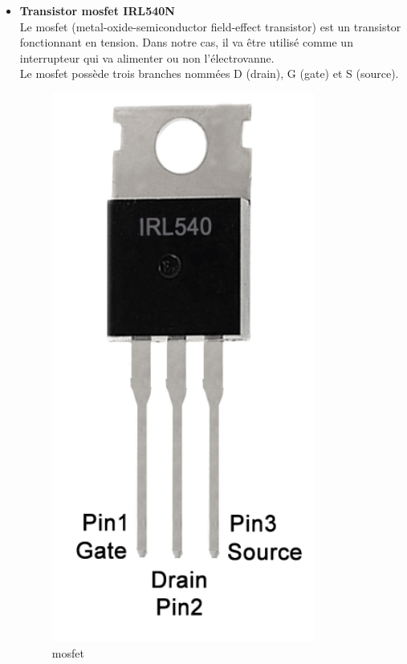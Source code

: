 \begin{itemize}
    \item \textbf{Transistor \gls{mosfet} IRL540N}\\
          Le \gls{mosfet} (metal-oxide-semiconductor field-effect transistor) est un transistor fonctionnant en tension. Dans notre cas, il va
          être utilisé comme un interrupteur qui va alimenter ou non l'électrovanne. \\
          Le \gls{mosfet} possède trois branches nommées D (drain), G (gate) et S (source). 
          \begin{figure}[H]
              \centering
              \includegraphics[scale = 0.3]{assets/figures/mosfet_visuel.png}
              \caption{\gls{mosfet}}
              \label{fig:mosfet}
          \end{figure}
          

\end{itemize}

